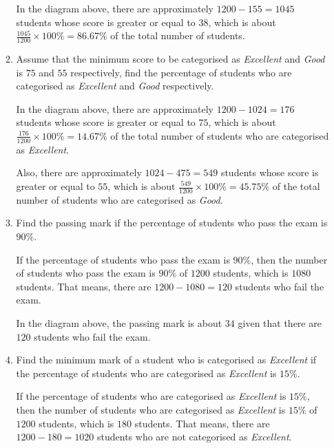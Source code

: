 \documentclass{report}
\begin{document}
\begin{multicols}{2}
\begin{enumerate}
\begin{enumerate}
                  In the diagram above, there are approximately $1200 - 155 = 1045$ students
                  whose score is greater or equal to $38$, which is about $\frac{1045}{1200}
                    \times 100\% = 86.67\%$ of the total number of students.

            \item Assume that the minimum score to be categorised as \textit{Excellent} and
                  \textit{Good} is $75$ and $55$ respectively, find the percentage of students
                  who are categorised as \textit{Excellent} and \textit{Good} respectively.
                  \sol{}

                  In the diagram above, there are approximately $1200 - 1024 = 176$ students
                  whose score is greater or equal to $75$, which is about $\frac{176}{1200}
                    \times 100\% = 14.67\%$ of the total number of students who are categorised as
                  \textit{Excellent}.

                  Also, there are approximately $1024 - 475 = 549$ students whose score is
                  greater or equal to $55$, which is about $\frac{549}{1200} \times 100\% =
                    45.75\%$ of the total number of students who are categorised as \textit{Good}.

            \item Find the passing mark if the percentage of students who pass the exam is
                  $90\%$. \sol{}

                  If the percentage of students who pass the exam is $90\%$, then the number of
                  students who pass the exam is $90\%$ of $1200$ students, which is $1080$
                  students. That means, there are $1200 - 1080 = 120$ students who fail the exam.

                  In the diagram above, the passing mark is about $34$ given that there are $120$
                  students who fail the exam.

            \item Find the minimum mark of a student who is categorised as \textit{Excellent} if
                  the percentage of students who are categorised as \textit{Excellent} is $15\%$.
                  \sol{}

                  If the percentage of students who are categorised as \textit{Excellent} is
                  $15\%$, then the number of students who are categorised as \textit{Excellent}
                  is $15\%$ of $1200$ students, which is $180$ students. That means, there are
                  $1200 - 180 = 1020$ students who are not categorised as \textit{Excellent}.


\end{enumerate}
\end{enumerate}
\end{multicols}
\end{document}
